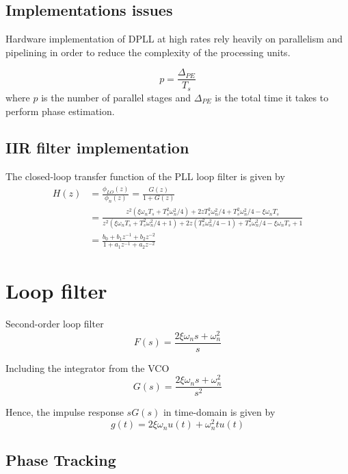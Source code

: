 \documentclass[a4paper]{article}
\begin{document}
\subsection{Implementations issues}
Hardware implementation of DPLL at high rates rely heavily on parallelism and pipelining in order to reduce the complexity of the processing units. 

\begin{equation}
p = \frac{\Delta_{PE}}{T_s}
\end{equation}
where $p$ is the number of parallel stages and $\Delta_{PE}$ is the total time it takes to perform phase estimation.

\subsection{IIR filter implementation}
The closed-loop transfer function of the PLL loop filter is given by
\begin{align} \nonumber
H(z) &= \frac{\phi_{LO}(z)}{\phi_n(z)} = \frac{G(z)}{1 + G(z)} \\ \nonumber
&= \frac{z^2(\xi\omega_nT_s + T_s^2\omega_n^2/4) + 2zT_s^2\omega_n^2/4 + T_s^2\omega_n^2/4 - \xi\omega_nT_s}{z^2(\xi\omega_nT_s + T_s^2\omega_n^2/4 + 1) + 2z(T_s^2\omega_n^2/4-1) + T_s^2\omega_n^2/4 - \xi\omega_nT_s + 1} \\
& = \frac{b_0 + b_1z^{-1} + b_2z^{-2}}{1 + a_1z^{-1} + a_2z^{-2}}
\end{align}

\section{Loop filter}

Second-order loop filter
\begin{equation}
F(s) = \frac{2\xi\omega_ns + \omega_n^2}{s}
\end{equation}

Including the integrator from the VCO
\begin{equation}
G(s) = \frac{2\xi\omega_ns + \omega_n^2}{s^2}
\end{equation}

Hence, the impulse response $sG(s)$ in time-domain is given by
\begin{equation}
g(t) = 2\xi\omega_nu(t) + \omega_n^2tu(t)
\end{equation}


\subsection{Phase Tracking}
\cite{Phase1995}
\end{document}
